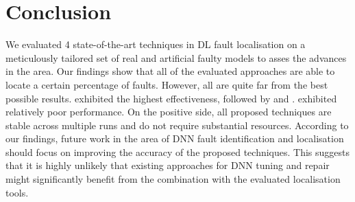 
\section{Conclusion}
\label{sec:conclusion}

We evaluated 4 state-of-the-art techniques in DL fault localisation on a  meticulously tailored set of real and artificial faulty models to asses the advances in the area. Our findings show that all of the evaluated approaches are able to locate a certain percentage of faults. However, all are quite far from the best possible results. \dfd exhibited the highest effectiveness, followed by \NL and \UM. \DD exhibited relatively poor performance. On the positive side, all proposed techniques are stable across multiple runs and do not require substantial resources. According to our findings, future work in the area of DNN fault identification and localisation should focus on improving the accuracy of the proposed techniques. This suggests that it is highly unlikely that existing approaches for DNN tuning and repair might significantly benefit from the combination with the evaluated localisation tools.